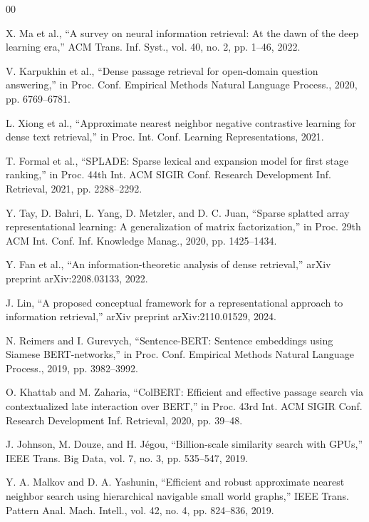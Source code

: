 \documentclass[conference]{IEEEtran}
\begin{document}
\footnotesize
\begin{thebibliography}{00}

 X. Ma et al., ``A survey on neural information retrieval: At the dawn of the deep learning era,'' ACM Trans. Inf. Syst., vol. 40, no. 2, pp. 1--46, 2022.

 V. Karpukhin et al., ``Dense passage retrieval for open-domain question answering,'' in Proc. Conf. Empirical Methods Natural Language Process., 2020, pp. 6769--6781.

 L. Xiong et al., ``Approximate nearest neighbor negative contrastive learning for dense text retrieval,'' in Proc. Int. Conf. Learning Representations, 2021.

 T. Formal et al., ``SPLADE: Sparse lexical and expansion model for first stage ranking,'' in Proc. 44th Int. ACM SIGIR Conf. Research Development Inf. Retrieval, 2021, pp. 2288--2292.

 Y. Tay, D. Bahri, L. Yang, D. Metzler, and D. C. Juan, ``Sparse splatted array representational learning: A generalization of matrix factorization,'' in Proc. 29th ACM Int. Conf. Inf. Knowledge Manag., 2020, pp. 1425--1434.

 Y. Fan et al., ``An information-theoretic analysis of dense retrieval,'' arXiv preprint arXiv:2208.03133, 2022.

 J. Lin, ``A proposed conceptual framework for a representational approach to information retrieval,'' arXiv preprint arXiv:2110.01529, 2024.

 N. Reimers and I. Gurevych, ``Sentence-BERT: Sentence embeddings using Siamese BERT-networks,'' in Proc. Conf. Empirical Methods Natural Language Process., 2019, pp. 3982--3992.

 O. Khattab and M. Zaharia, ``ColBERT: Efficient and effective passage search via contextualized late interaction over BERT,'' in Proc. 43rd Int. ACM SIGIR Conf. Research Development Inf. Retrieval, 2020, pp. 39--48.

 J. Johnson, M. Douze, and H. Jégou, ``Billion-scale similarity search with GPUs,'' IEEE Trans. Big Data, vol. 7, no. 3, pp. 535--547, 2019.

 Y. A. Malkov and D. A. Yashunin, ``Efficient and robust approximate nearest neighbor search using hierarchical navigable small world graphs,'' IEEE Trans. Pattern Anal. Mach. Intell., vol. 42, no. 4, pp. 824--836, 2019.


\end{thebibliography}
\end{document}

